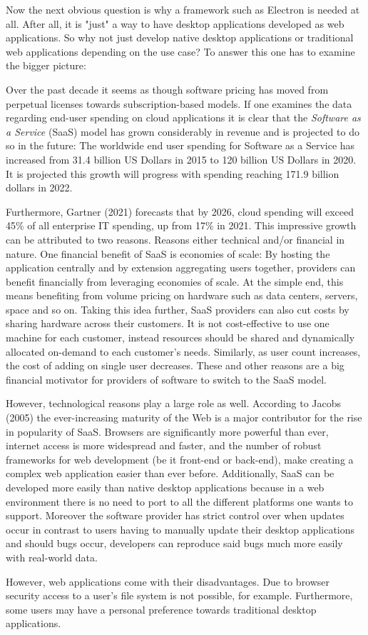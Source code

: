 Now the next obvious question is why a framework such as Electron is needed at all.
After all, it is "just" a way to have desktop applications developed as web applications.
So why not just develop native desktop applications or traditional web applications depending on the use case?
To answer this one has to examine the bigger picture:\par
Over the past decade it seems as though software pricing has moved from perpetual licenses towards subscription-based
models.
If one examines the data regarding end-user spending on cloud applications it is clear that the
\emph{Software as a Service} (SaaS) model has grown considerably in revenue and is projected to do so in the future:
The worldwide end user spending for Software as a Service has increased from 31.4 billion US Dollars in 2015 to 120
billion US Dollars in 2020.
It is projected this growth will progress with spending reaching 171.9 billion dollars in 2022.\cite{gartner2021}\par
Furthermore, Gartner (2021) forecasts that by 2026, cloud spending will exceed 45\% of all enterprise IT spending, up from
17\% in 2021.
This impressive growth can be attributed to two reasons.
Reasons either technical and/or financial in nature.
One financial benefit of SaaS is economies of scale:
By hosting the application centrally and by extension aggregating users together, providers can benefit financially from
leveraging economies of scale.
At the simple end, this means benefiting from volume pricing on hardware such as data centers, servers, space and so on.
Taking this idea further, SaaS providers can also cut costs by sharing hardware across their customers.
It is not cost-effective to use one machine for each customer, instead resources should be shared and dynamically
allocated on-demand to each customer's needs.
Similarly, as user count increases, the cost of adding on single user decreases.
These and other reasons are a big financial motivator for providers of software to switch to the SaaS model.\par
However, technological reasons play a large role as well.
According to Jacobs (2005) the ever-increasing maturity of the Web is a major contributor for the rise in popularity of
SaaS\@.
Browsers are significantly more powerful than ever, internet access is more widespread and faster, and the number
of robust frameworks for web development (be it front-end or back-end), make creating a complex web application easier
than ever before.\cite{akamai2017, statista2021}
Additionally, SaaS can be developed more easily than native desktop applications because in a web environment there is no
need to port to all the different platforms one wants to support. 
Moreover the software provider has strict control over when updates occur in contrast to users having to manually update their 
desktop applications and should bugs occur, developers can reproduce said bugs much more easily with real-world data.\cite{jacobs2005}\par
However, web applications come with their disadvantages. Due to browser security access to a user's file system is not possible, for example.
Furthermore, some users may have a personal preference towards traditional desktop applications. 
